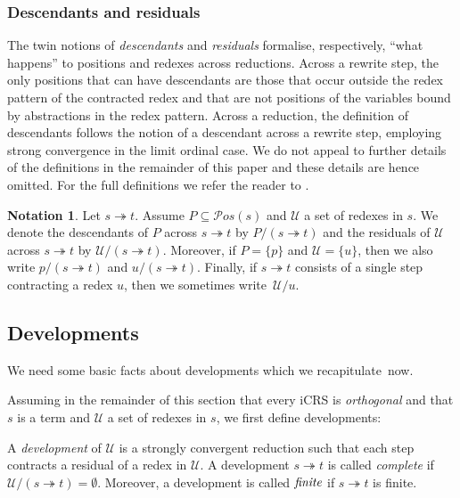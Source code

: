 \documentclass{LMCS}
\theoremstyle{definition}
\newtheorem{notation}[thm]{Notation}
\newcommand{\trewt}{\twoheadrightarrow}
\newcommand{\pos}[1]{\mathcal{P}os(#1)}
\begin{document}
\subsubsection{Descendants and residuals}
\label{sec:desc}

The twin notions of \emph{descendants} and \emph{residuals} formalise, respectively, ``what happens'' to positions and redexes across reductions. Across a rewrite step, the only positions that can have descendants are those that occur outside the redex pattern of the contracted redex and that are not positions of the variables bound by abstractions in the redex pattern. Across a reduction, the definition of descendants follows the notion of a descendant across a rewrite step, employing strong convergence in the limit ordinal case. We do not appeal to further details of the definitions in the remainder of this paper and these details are hence omitted. For the full definitions we refer the reader to \cite{JJ05a}.

\begin{notation}
Let $s \trewt t$. Assume $P \subseteq \pos{s}$ and $\mathcal{U}$ a set of redexes in $s$. We denote the descendants of $P$ across $s \trewt t$ by $P/(s \trewt t)$ and the residuals of $\mathcal{U}$ across $s \trewt t$ by $\mathcal{U}/(s \trewt t)$. Moreover, if $P = \{ p \}$ and $\mathcal{U} = \{ u \}$, then we also write $p/(s \trewt t)$ and $u/(s \trewt t)$. Finally, if $s \trewt t$ consists of a single step contracting a redex $u$, then we sometimes write~$\mathcal{U}/u$.
\end{notation}


\subsection{Developments}

We need some basic facts about developments which we recapitulate~now.

Assuming in the remainder of this section that every iCRS is \emph{orthogonal} and that $s$ is a term and $\mathcal{U}$ a set of redexes in $s$, we first define developments:
\begin{defi}
A \emph{development} of $\mathcal{U}$ is a strongly convergent reduction
such that each step contracts a residual of a redex in $\mathcal{U}$. A
development $s  \trewt t$ is called \emph{complete} if $\mathcal{U}/(s \trewt
t) = \emptyset$. Moreover, a development is called $\emph{finite}$ if
$s \trewt t$ is finite.
\end{defi}
\end{document}
